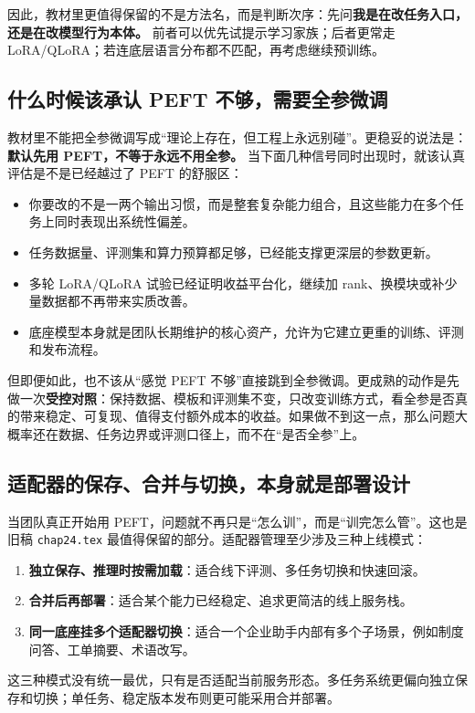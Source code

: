 因此，教材里更值得保留的不是方法名，而是判断次序：先问\textbf{我是在改任务入口，还是在改模型行为本体。} 前者可以优先试提示学习家族；后者更常走 LoRA/QLoRA；若连底层语言分布都不匹配，再考虑继续预训练。

\subsection{什么时候该承认 PEFT 不够，需要全参微调}
教材里不能把全参微调写成“理论上存在，但工程上永远别碰”。更稳妥的说法是：\textbf{默认先用 PEFT，不等于永远不用全参。} 当下面几种信号同时出现时，就该认真评估是不是已经越过了 PEFT 的舒服区：
\begin{itemize}
  \item 你要改的不是一两个输出习惯，而是整套复杂能力组合，且这些能力在多个任务上同时表现出系统性偏差。
  \item 任务数据量、评测集和算力预算都足够，已经能支撑更深层的参数更新。
  \item 多轮 LoRA/QLoRA 试验已经证明收益平台化，继续加 rank、换模块或补少量数据都不再带来实质改善。
  \item 底座模型本身就是团队长期维护的核心资产，允许为它建立更重的训练、评测和发布流程。
\end{itemize}

但即便如此，也不该从“感觉 PEFT 不够”直接跳到全参微调。更成熟的动作是先做一次\textbf{受控对照}：保持数据、模板和评测集不变，只改变训练方式，看全参是否真的带来稳定、可复现、值得支付额外成本的收益。如果做不到这一点，那么问题大概率还在数据、任务边界或评测口径上，而不在“是否全参”上。

\subsection{适配器的保存、合并与切换，本身就是部署设计}
当团队真正开始用 PEFT，问题就不再只是“怎么训”，而是“训完怎么管”。这也是旧稿 \texttt{chap24.tex} 最值得保留的部分。适配器管理至少涉及三种上线模式：
\begin{enumerate}
  \item \textbf{独立保存、推理时按需加载}：适合线下评测、多任务切换和快速回滚。
  \item \textbf{合并后再部署}：适合某个能力已经稳定、追求更简洁的线上服务栈。
  \item \textbf{同一底座挂多个适配器切换}：适合一个企业助手内部有多个子场景，例如制度问答、工单摘要、术语改写。
\end{enumerate}

这三种模式没有统一最优，只有是否适配当前服务形态。多任务系统更偏向独立保存和切换；单任务、稳定版本发布则更可能采用合并部署。

